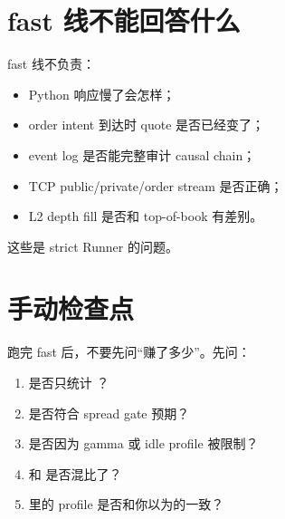 \section{fast 线不能回答什么}

fast 线不负责：

\begin{itemize}[leftmargin=2em]
  \item Python 响应慢了会怎样；
  \item order intent 到达时 quote 是否已经变了；
  \item event log 是否能完整审计 causal chain；
  \item TCP public/private/order stream 是否正确；
  \item L2 depth fill 是否和 top-of-book 有差别。
\end{itemize}

这些是 strict Runner 的问题。

\section{手动检查点}

跑完 fast 后，不要先问“赚了多少”。先问：

\begin{enumerate}[leftmargin=2em]
  \item {} 是否只统计 ？
  \item {} 是否符合 spread gate 预期？
  \item {} 是否因为 gamma 或 idle profile 被限制？
  \item {} 和  是否混比了？
  \item {} 里的 profile 是否和你以为的一致？
\end{enumerate}


